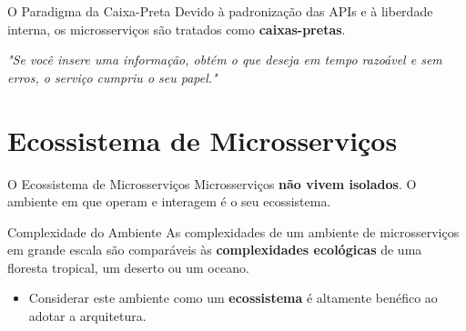 \documentclass[aspectratio=169]{beamer}
\begin{document}
\begin{frame}{O Paradigma da Caixa-Preta}
    Devido à padronização das APIs e à liberdade interna, os microsserviços são tratados como \textbf{caixas-pretas}.
    \vspace{0.4cm}
    \begin{center}
    \end{center}
    \vspace{0.3cm}
    \centering
    \textit{"Se você insere uma informação, obtém o que deseja em tempo razoável e sem erros, o serviço cumpriu o seu papel."}
\end{frame}

\section{Ecossistema de Microsserviços}

\begin{frame}{O Ecossistema de Microsserviços}
    Microsserviços \textbf{não vivem isolados}. O ambiente em que operam e interagem é o seu ecossistema.
    \vspace{0.4cm}
    \begin{alertblock}{Complexidade do Ambiente}
        As complexidades de um ambiente de microsserviços em grande escala são comparáveis às \textbf{complexidades ecológicas} de uma floresta tropical, um deserto ou um oceano.
    \end{alertblock}
    \vspace{0.4cm}
    \begin{itemize}
        \item Considerar este ambiente como um \textbf{ecossistema} é altamente benéfico ao adotar a arquitetura.
    \end{itemize}
\end{frame}
\end{document}
